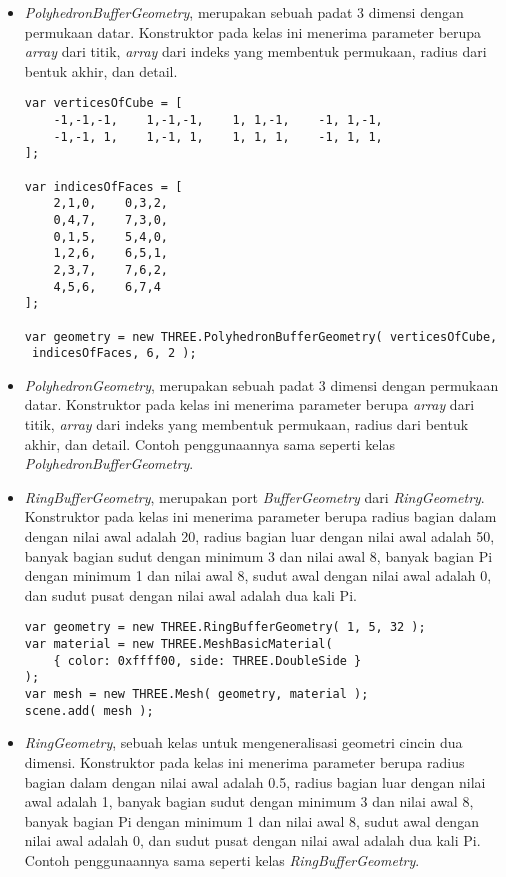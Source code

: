 \begin{itemize}
\begin{itemize}
	\item {\it PolyhedronBufferGeometry}, merupakan sebuah padat 3 dimensi dengan permukaan datar. Konstruktor pada kelas ini menerima parameter berupa {\it array} dari titik, {\it array} dari indeks yang membentuk permukaan, radius dari bentuk akhir, dan detail.
	
\begin{lstlisting}[caption={Contoh penggunaan kelas {\it PolyhedronBufferGeometry}.},captionpos=b]
var verticesOfCube = [
    -1,-1,-1,    1,-1,-1,    1, 1,-1,    -1, 1,-1,
    -1,-1, 1,    1,-1, 1,    1, 1, 1,    -1, 1, 1,
];

var indicesOfFaces = [
    2,1,0,    0,3,2,
    0,4,7,    7,3,0,
    0,1,5,    5,4,0,
    1,2,6,    6,5,1,
    2,3,7,    7,6,2,
    4,5,6,    6,7,4
];

var geometry = new THREE.PolyhedronBufferGeometry( verticesOfCube,
 indicesOfFaces, 6, 2 );
\end{lstlisting}

	\item {\it PolyhedronGeometry}, merupakan sebuah padat 3 dimensi dengan permukaan datar. Konstruktor pada kelas ini menerima parameter berupa {\it array} dari titik, {\it array} dari indeks yang membentuk permukaan, radius dari bentuk akhir, dan detail. Contoh penggunaannya sama seperti kelas {\it PolyhedronBufferGeometry}.
	
	\item {\it RingBufferGeometry}, merupakan port {\it BufferGeometry} dari {\it RingGeometry}. Konstruktor pada kelas ini menerima parameter berupa radius bagian dalam dengan nilai awal adalah 20, radius bagian luar dengan nilai awal adalah 50, banyak bagian sudut dengan minimum 3 dan nilai awal 8, banyak bagian Pi dengan minimum 1 dan nilai awal 8, sudut awal dengan nilai awal adalah 0, dan sudut pusat dengan nilai awal adalah dua kali Pi. 
	
\begin{lstlisting}[caption={Contoh penggunaan kelas {\it RingBufferGeometry}.},captionpos=b]
var geometry = new THREE.RingBufferGeometry( 1, 5, 32 );
var material = new THREE.MeshBasicMaterial( 
	{ color: 0xffff00, side: THREE.DoubleSide } 
);
var mesh = new THREE.Mesh( geometry, material );
scene.add( mesh );
\end{lstlisting}

	\item {\it RingGeometry}, sebuah kelas untuk mengeneralisasi geometri cincin dua dimensi. Konstruktor pada kelas ini menerima parameter berupa radius bagian dalam dengan nilai awal adalah 0.5, radius bagian luar dengan nilai awal adalah 1, banyak bagian sudut dengan minimum 3 dan nilai awal 8, banyak bagian Pi dengan minimum 1 dan nilai awal 8, sudut awal dengan nilai awal adalah 0, dan sudut pusat dengan nilai awal adalah dua kali Pi.  Contoh penggunaannya sama seperti kelas {\it RingBufferGeometry}.
	

\end{itemize}
\end{itemize}
